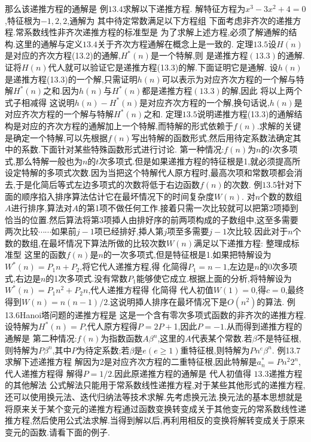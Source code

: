 那么该递推方程的通解是
例$13.4$求解以下递推方程.
解特征方程为$x^{3}-3x^{2}+4=0$,特征根为$-1,2,2$,通解为
其中待定常数满足以下方程组
下面考虑非齐次的递推方程.常系数线性非齐次递推方程的标准型是
为了求解上述方程,必须了解通解的结构.这里的通解与定义$13.4$关于齐次方程通解在概念上是一致的.
定理$13.5$设$\overline{H(n)}$是对应的齐次方程(13.2)的通解,$H^{*}(n)$是一个特解,则
是递推方程$(13.3)$的通解.
证将$H(n)$代人就可以验证它是递推方程(13.3)的解.下面证明它是通解.
设$h(n)$是递推方程(13.3)的一个解,只需证明$h(n)$可以表示为对应齐次方程的一个解与特解$H^{*}(n)$之和.因为$h(n)$与$H^{*}(n)$都是递推方程$(13.3)$的解,因此
将以上两个式子相减得
这说明$h(n)-H^{*}(n)$是对应齐次方程的一个解,换句话说,$h(n)$是对应齐次方程的一个解与特解$H^{*}(n)$之和.
定理$13.5$说明递推方程(13.3)的通解结构是对应的齐次方程的通解加上一个特解,而特解的形式依赖于$f(n)$.求解的关键是确定一个特解,可以先根据$f(n)$写出特解的函数形式,然后用待定系数法确定其中的系数.下面针对某些特殊函数形式进行讨论.
第一种情况:$f(n)$为$n$的$t$次多项式,那么特解一般也为$n$的$t$次多项式.但是如果递推方程的特征根是1,就必须提高所设定特解的多项式次数.因为当把这个特解代人原方程时,最高次项和常数项都会消去,于是化简后等式左边多项式的次数将低于右边函数$f(n)$的次数.
例$13.5$针对下面的顺序掐入排序算法估计它在最坏情况下的时间复杂度$W(n)$.
对$n$个数的数组$A$进行排序,算法对$A$的第1项不做任何工作.接着只需一次比较就可以把第2项揷到恰当的位置.然后算法将第3项揷人由排好序的前两项构成的子数组中,这至多需要两次比较$\cdots\cdots$如果前$j-1$项已经排好,揷人第$j$项至多需要$j-1$次比较.因此对于$n$个数的数组,在最坏情况下算法所做的比较次数$W(n)$满足以下递推方程:
整理成标准型
这里的函数$f(n)$是$n$的一次多项式,但是特征根是1.如果把特解设为$W^{*}(n)=P_{1}n+P_{2}$,将它代人递推方程,得
化简得$P_{1}=n-1$,左边是$n$的0次多项式,右边是$n$的1次多项式.没有常数$P_{1}$能够使它成立.根据上面的分析,将特解设为$W^{*}(n)=P_{1}n^{2}+P_{2}n$,代人递推方程得
化简得
代人初值$W(1)=0$,得$c=0$,最终得到$W(n)=n(n-1)/2$.这说明揷人排序在最坏情况下是$O\left(n^{2}\right)$的算法.
例13.6Hanoi塔问题的递推方程是
这是一个含有零次多项式函数的非齐次的递推方程.设特解为$H^{*}(n)=P$,代人原方程得$P=2P+$1,因此$P=-1$.从而得到递推方程的通解是
第二种情况:$f(n)$为指数函数$A\beta^{n}$,这里的$A$代表某个常数.若$\beta$不是特征根,则特解为$P\beta^{n}$,其中$P$为待定系数;若$\beta$是$e(e\geqslant1)$重特征根,则特解为$Pn^{e}\beta^{n}$.
例13.7求解下述递推方程
解因为2是对应齐次方程的二重特征根,因此特解是$a_{n}^{*}=Pn^{2}2^{n}$,代人递推方程得
解得$P=1/2$.因此原递推方程的通解是
代人初值得
{$13.3$递推方程的其他解法}
公式解法只能用于常系数线性递推方程,对于某些其他形式的递推方程,还可以使用换元法、迭代归纳法等技术求解.先考虑换元法.换元法的基本思想就是将原来关于某个变元的递推方程通过函数变换转变成关于其他变元的常系数线性递推方程,然后使用公式法求解.当得到解以后,再利用相反的变换将解转变成关于原来变元的函数.请看下面的例子.
